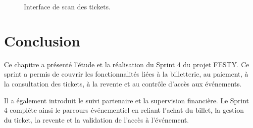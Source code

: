 \begin{figure}[H]
\centering
{}
\caption{Interface de scan des tickets.}
\label{figure:6-9}
\end{figure}


\section{Conclusion}


Ce chapitre a présenté l’étude et la réalisation du Sprint 4 du projet FESTY. Ce sprint a permis de couvrir les fonctionnalités liées à la billetterie, au paiement, à la consultation des tickets, à la revente et au contrôle d’accès aux événements.


Il a également introduit le suivi partenaire et la supervision financière. Le Sprint 4 complète ainsi le parcours événementiel en reliant l’achat du billet, la gestion du ticket, la revente et la validation de l’accès à l’événement.


